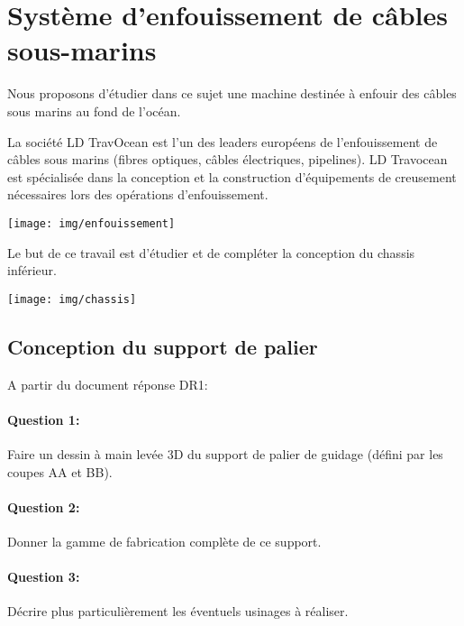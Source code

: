 

\newpage

\section{Système d'enfouissement de câbles sous-marins}

Nous proposons d'étudier dans ce sujet une machine destinée à enfouir des câbles sous marins au fond de l'océan.

La société LD TravOcean est l'un des leaders européens de l'enfouissement de câbles sous marins (fibres optiques, câbles électriques, pipelines). LD Travocean est spécialisée dans la conception et la construction d'équipements de creusement nécessaires lors des opérations d'enfouissement.

\begin{center}
 \texttt{[image: img/enfouissement]}
\end{center}

Le but de ce travail est d'étudier et de compléter la conception du chassis inférieur.

\begin{center}
 \texttt{[image: img/chassis]}
\end{center}

\subsection{Conception du support de palier}

A partir du document réponse DR1:

\paragraph{Question 1:} Faire un dessin à main levée 3D du support de palier de guidage (défini par les coupes AA et BB).

\paragraph{Question 2:} Donner la gamme de fabrication complète de ce support.

\paragraph{Question 3:} Décrire plus particulièrement les éventuels usinages à réaliser.

